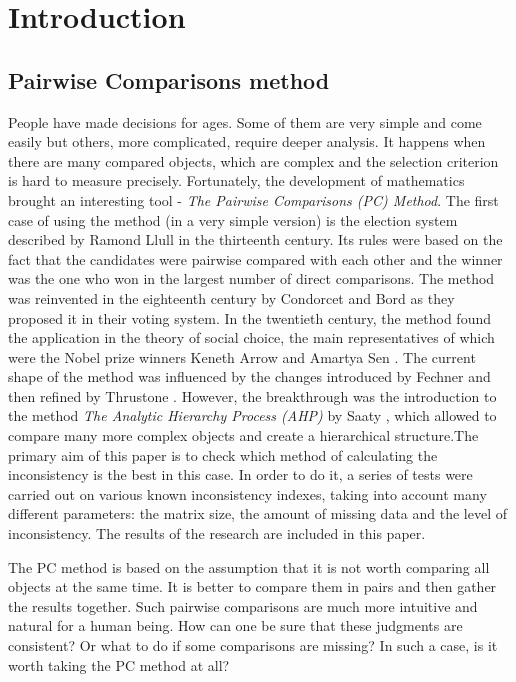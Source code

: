 \chapter{Introduction}
\label{cha:wprowadzenie}

\section{Pairwise Comparisons method}
\label{sec:metodaPorowan}
People have made decisions for ages. Some of them are very simple and come easily but others, more complicated, require deeper analysis. It happens when there are many compared objects, which are complex and the selection criterion is hard to measure precisely. Fortunately, the development of mathematics brought an interesting tool - \textit{The Pairwise Comparisons (PC) Method}. The first case of using the method (in a very simple version) is the election system described by Ramond Llull \cite{Colomer2013} in the thirteenth century. Its rules were based on the fact that the candidates were pairwise compared with each other and the winner was the one who won in the largest number of direct comparisons. The method was reinvented in the eighteenth century by Condorcet and Bord \cite{Kulakowski2016} as they proposed it in their voting system. In the twentieth century, the method found the application in the theory of social choice, the main representatives of which were the Nobel prize winners Keneth Arrow \cite{Arrow} and Amartya Sen \cite{Sen}. The current shape of the method was influenced by the changes introduced by Fechner \cite{Fechner1966} and then refined by {Thrustone} \cite{Thurstone1994}. However, the breakthrough was the introduction to the method \textit\textit{The Analytic Hierarchy Process (AHP)} by Saaty \cite{Saaty2008}, which allowed to compare many more complex objects and create a hierarchical structure.The primary aim of this paper is to check which method of calculating the inconsistency is the best in this case. In order to do it, a series of tests were carried out on various known inconsistency indexes, taking into account many different parameters: the matrix size, the amount of missing data and the level of inconsistency. The results of the research are included in this paper.

The PC method is based on the assumption that it is not worth comparing all objects at the same time. It is better to compare them in pairs and then gather the results together. Such pairwise comparisons are much more intuitive and natural for a human being. How can one be sure that these judgments are consistent? Or what to do if some comparisons are missing? In such a case, is it worth taking the PC method at all?

